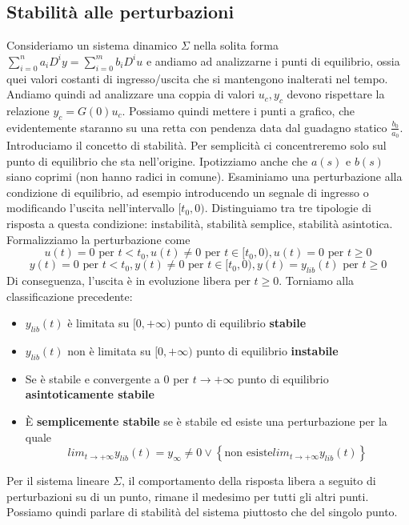 \documentclass[11pt]{article}
\begin{document}
\subsection{Stabilità alle perturbazioni}
Consideriamo un sistema dinamico $\Sigma$ nella solita forma $\sum_{i=0}^n a_i D^i y = \sum_{i=0}^m b_i D^i u$ e andiamo ad analizzarne i punti di equilibrio, ossia quei valori costanti di ingresso/uscita che si mantengono inalterati nel tempo. Andiamo quindi ad analizzare una coppia di valori $u_c, y_c$ devono rispettare la relazione $y_c = G(0)u_c$. Possiamo quindi mettere i punti a grafico, che evidentemente staranno su una retta con pendenza data dal guadagno statico $\frac{b_0}{a_0}$.
Introduciamo il concetto di stabilità. Per semplicità ci concentreremo solo sul punto di equilibrio che sta nell'origine. Ipotizziamo anche che $a(s)$ e $b(s)$ siano coprimi (non hanno radici in comune). Esaminiamo una perturbazione alla condizione di equilibrio, ad esempio introducendo un segnale di ingresso o modificando l'uscita nell'intervallo $[t_0,0)$. 
Distinguiamo tra tre tipologie di risposta a questa condizione: instabilità, stabilità semplice, stabilità asintotica. Formalizziamo la perturbazione come
\begin{displaymath}
    u(t) = 0 \textrm{ per }t<t_0, u(t) \neq 0 \textrm{ per }t\in[t_0, 0), u(t)=0 \textrm{ per }t\ge0
\end{displaymath}
\begin{displaymath}
    y(t) = 0 \textrm{ per }t<t_0, y(t) \neq 0 \textrm{ per }t\in [t_0,0), y(t)=y_{lib}(t) \textrm{ per }t\ge0
\end{displaymath}
Di conseguenza, l'uscita è in evoluzione libera per $t\ge0$.
Torniamo alla classificazione precedente:
\begin{itemize}
    \item $y_{lib}(t)$ è limitata su $[0,+\infty)$ punto di equilibrio \textbf{stabile}
    \item $y_{lib}(t)$ non è limitata su $[0,+\infty)$ punto di equilibrio \textbf{instabile}
    \item Se è stabile e convergente a $0$ per $t\rightarrow+\infty$ punto di equilibrio \textbf{asintoticamente stabile}
    \item È \textbf{semplicemente stabile} se è stabile ed esiste una perturbazione per la quale \begin{displaymath}
        lim_{t\rightarrow+\infty}y_{lib}(t)=y_\infty \neq 0 \vee \left\{\textrm{non esiste} lim_{t\rightarrow+\infty} y_{lib}(t)\right\}
    \end{displaymath} 
\end{itemize}
\begin{center}
    Per il sistema lineare $\Sigma$, il comportamento della risposta libera a seguito di perturbazioni su di un punto, rimane il medesimo per tutti gli altri punti. Possiamo quindi parlare di stabilità del sistema piuttosto che del singolo punto.
\end{center}
\end{document}

